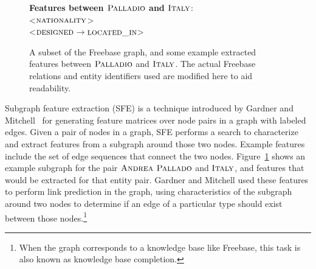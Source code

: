 \documentclass[11pt]{article}
\newcommand{\figref}[1]{Figure~\ref{fig:#1}}
\newcommand{\formalpredicate}[1]{\ensuremath{\textsc{#1}}}
\newcommand{\entity}[1]{\ensuremath{\textsc{#1}}}
\begin{document}
\begin{figure}
  {\center
  }
  \textbf{Features between \entity{Palladio} and \entity{Italy}}:\\
  \textless\formalpredicate{nationality}\textgreater\\
  \textless\formalpredicate{designed}$\rightarrow$\formalpredicate{located\_in}\textgreater
  \caption{A subset of the Freebase graph, and some example extracted
  features between \entity{Palladio} and \entity{Italy}.  The actual
  Freebase relations and entity identifiers used are modified here to
  aid readability.}
  \label{fig:sfe}
\end{figure}

Subgraph feature extraction (SFE) is a technique introduced by Gardner
and Mitchell~ for generating feature
matrices over node pairs in a graph with labeled edges.  Given a pair
of nodes in a graph, SFE performs a search to characterize and extract
features from a subgraph around those two nodes.  Example features
include the set of edge sequences that connect the two nodes.
\figref{sfe} shows an example subgraph for the pair \entity{Andrea
Pallado} and \entity{Italy}, and features that would be extracted for
that entity pair.  Gardner and Mitchell used these features to perform
link prediction in the graph, using characteristics of the subgraph
around two nodes to determine if an edge of a particular type should
exist between those nodes.\footnote{When the graph corresponds to a
knowledge base like Freebase, this task is also known as knowledge
base completion.}
\end{document}
